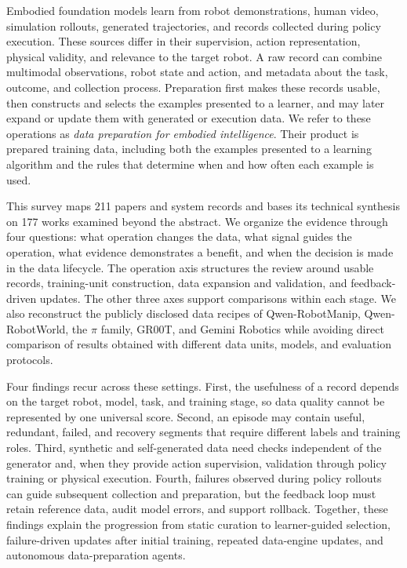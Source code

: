 Embodied foundation models learn from robot demonstrations, human video, simulation rollouts, generated trajectories, and records collected during policy execution.
These sources differ in their supervision, action representation, physical validity, and relevance to the target robot.
A raw record can combine multimodal observations, robot state and action, and metadata about the task, outcome, and collection process.
Preparation first makes these records usable, then constructs and selects the examples presented to a learner, and may later expand or update them with generated or execution data.
We refer to these operations as \emph{data preparation for embodied intelligence}.
Their product is prepared training data, including both the examples presented to a learning algorithm and the rules that determine when and how often each example is used.

This survey maps 211 papers and system records and bases its technical synthesis on 177 works examined beyond the abstract.
We organize the evidence through four questions: what operation changes the data, what signal guides the operation, what evidence demonstrates a benefit, and when the decision is made in the data lifecycle.
The operation axis structures the review around usable records, training-unit construction, data expansion and validation, and feedback-driven updates.
The other three axes support comparisons within each stage.
We also reconstruct the publicly disclosed data recipes of Qwen-RobotManip, Qwen-RobotWorld, the $\pi$ family, GR00T, and Gemini Robotics while avoiding direct comparison of results obtained with different data units, models, and evaluation protocols.

Four findings recur across these settings.
First, the usefulness of a record depends on the target robot, model, task, and training stage, so data quality cannot be represented by one universal score.
Second, an episode may contain useful, redundant, failed, and recovery segments that require different labels and training roles.
Third, synthetic and self-generated data need checks independent of the generator and, when they provide action supervision, validation through policy training or physical execution.
Fourth, failures observed during policy rollouts can guide subsequent collection and preparation, but the feedback loop must retain reference data, audit model errors, and support rollback.
Together, these findings explain the progression from static curation to learner-guided selection, failure-driven updates after initial training, repeated data-engine updates, and autonomous data-preparation agents.
